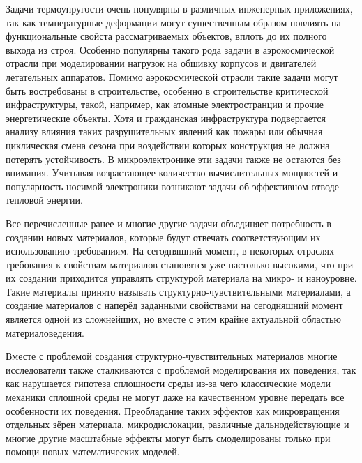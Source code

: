 
{\actuality}
Задачи термоупругости очень популярны в различных инженерных приложениях, так как температурные деформации могут существенным образом повлиять на функциональные свойста рассматриваемых объектов, вплоть до их полного выхода из строя. Особенно популярны такого рода задачи в аэрокосмической отрасли при моделировании нагрузок на обшивку корпусов и двигателей летательных аппаратов. Помимо аэрокосмической отрасли такие задачи могут быть востребованы в строительстве, особенно в строительстве критической инфраструктуры, такой, например, как атомные электространции и прочие энергетические объекты. Хотя и гражданская инфраструктура подвергается анализу влияния таких разрушительных явлений как пожары или обычная циклическая смена сезона при воздействии которых конструкция не должна потерять устойчивость. В микроэлектронике эти задачи также не остаются без внимания. Учитывая возрастающее количество вычислительных мощностей и популярность носимой электроники возникают задачи об эффективном отводе тепловой энергии.

Все перечисленные ранее и многие другие задачи объединяет потребность в создании новых материалов, которые будут отвечать соответствующим их использованию требованиям. На сегодняшний момент, в некоторых отраслях требования к свойствам материалов становятся уже настолько высокими, что при их создании приходится управлять структурой материала на микро- и наноуровне. Такие материалы принято называть структурно-чувствительными материалами, а создание материалов с наперёд заданными свойствами на сегодняшний момент является одной из сложнейших, но вместе с этим крайне актуальной областью материаловедения.

Вместе с проблемой создания структурно-чувствительных материалов многие исследователи также сталкиваются с проблемой моделирования их поведения, так как нарушается гипотеза сплошности среды из-за чего классические модели механики сплошной среды не могут даже на качественном уровне передать все особенности их поведения. Преобладание таких эффектов как микровращения отдельных зёрен материала, микродислокации, различные дальнодействующие и многие другие масштабные эффекты могут быть смоделированы только при помощи новых математических моделей.

